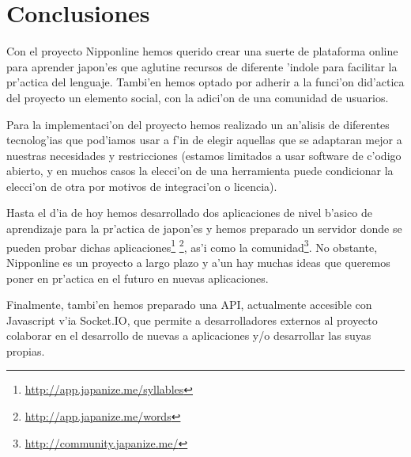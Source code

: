 \section{Conclusiones}
\label{sec:conclusiones}

Con el proyecto Nipponline hemos querido crear una suerte de plataforma online para aprender japon'es que aglutine 
recursos de diferente 'indole para facilitar la pr'actica del lenguaje. Tambi'en hemos optado por adherir a la funci'on 
did'actica del proyecto un elemento social, con la adici'on de una comunidad de usuarios.

Para la implementaci'on del proyecto hemos realizado un an'alisis de diferentes tecnolog'ias que pod'iamos usar a f'in de 
elegir aquellas que se adaptaran mejor a nuestras necesidades y restricciones (estamos limitados a usar software de 
c'odigo abierto, y en muchos casos la elecci'on de una herramienta puede condicionar la elecci'on de otra por motivos de 
integraci'on o licencia).

Hasta el d'ia de hoy hemos desarrollado dos aplicaciones de nivel b'asico de aprendizaje para la pr'actica de japon'es y 
hemos preparado un servidor donde se pueden probar dichas 
aplicaciones\footnote{\url{http://app.japanize.me/syllables}} \footnote{\url{http://app.japanize.me/words}}, as'i como 
la comunidad\footnote{\url{http://community.japanize.me/}}. No obstante, Nipponline es un proyecto a largo plazo y 
a'un hay muchas ideas que queremos poner en pr'actica en el futuro en nuevas aplicaciones.

Finalmente, tambi'en hemos preparado una API, actualmente accesible con Javascript v'ia Socket.IO, que permite a 
desarrolladores externos al proyecto colaborar en el desarrollo de nuevas a aplicaciones y/o desarrollar las suyas 
propias.
